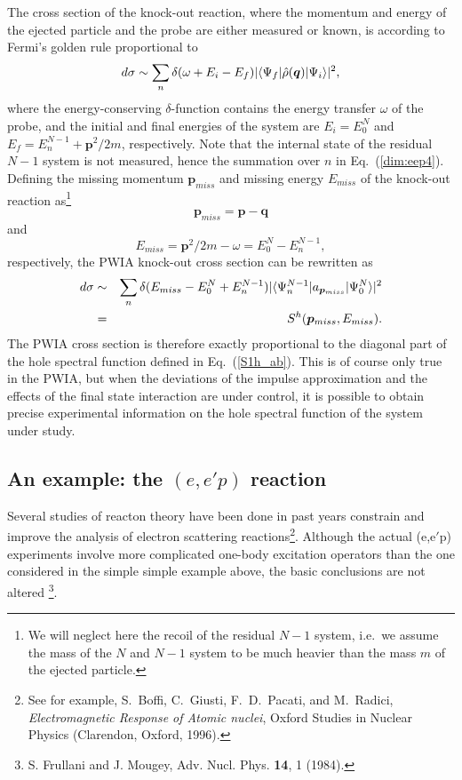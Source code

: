 The cross section of the knock-out reaction, where the momentum and energy of
the ejected particle and the probe are either measured or known, is according 
to Fermi's golden rule proportional to
\begin{equation}
\label{dim:eep4}
d\sigma \sim
\sum_n \delta (\omega 
+E_i -E_f) |\langle \Psi_f \vert\hat{\rho}({\bm q})\vert \Psi_i\rangle|^2,
\end{equation}
where the energy-conserving $\delta$-function contains the energy transfer 
$\omega$ of the probe, and the initial and final energies of the system 
are $E_i = E^N_0$ and $E_f =E^{N-1}_n +{\bm p}^2/2m$, respectively. Note that 
the internal state of the residual $N-1$ system is not measured, hence the 
summation over $n$ in Eq.~(\ref{dim:eep4}). 
Defining the missing momentum $\bm{p}_{miss}$ and missing energy $E_{miss}$ 
of the 
knock-out reaction as\footnote{We will neglect here the recoil of the residual
$N-1$ system, i.e.\ we assume the mass of the $N$ and $N-1$ system to be much 
heavier than the mass $m$ of the ejected particle.}
\begin{equation}
\bm{p}_{miss}={\bm p} - {\bm q}
\label{eq:eepx}
\end{equation}
and
\begin{equation}
E_{miss} ={\bm p}^2/2m -  \omega = E^N_0-E^{N-1}_n ,
\label{eq:eepy}
\end{equation} 
respectively,
the PWIA knock-out cross section can be rewritten as 
\begin{eqnarray} 
d\sigma &\sim&
\sum_n \delta (E_{miss}-E^N_0+E^{N-1}_n ) |\langle \Psi^{N-1}_{n} \vert
a_{\bm{p}_{miss}}\vert \Psi^N_0 \rangle|^2
\nonumber\\
& = & S^h (\bm{p}_{miss},E_{miss}) .
\label{dim:eep6}
\end{eqnarray}
The PWIA cross section is therefore exactly proportional to the diagonal
part of the hole spectral function defined in Eq.~(\ref{S1h_ab}). 
This is of course only true in the PWIA, but when the 
deviations of the impulse approximation and the effects of the final state 
interaction are under control, it is possible to obtain precise 
experimental information on the hole spectral function of the system under 
study.



\subsection{An example: the $(e,e'p)$ reaction}

Several studies of reacton theory have been done in past years
constrain and improve the analysis of electron scattering reactions\footnote{See for example, 
S.~Boffi, C.~Giusti, F.~D.~Pacati, and M.~Radici,
{\em Electromagnetic Response of Atomic nuclei}, 
Oxford Studies in Nuclear Physics (Clarendon, Oxford, 1996).}.
 Although the actual (e,e$'$p) experiments involve more complicated
one-body excitation operators than the one considered in the simple simple
example above, the basic conclusions are not altered%
\footnote{S. Frullani and J. Mougey, Adv. Nucl. Phys. \textbf{14}, 1 (1984).}.



